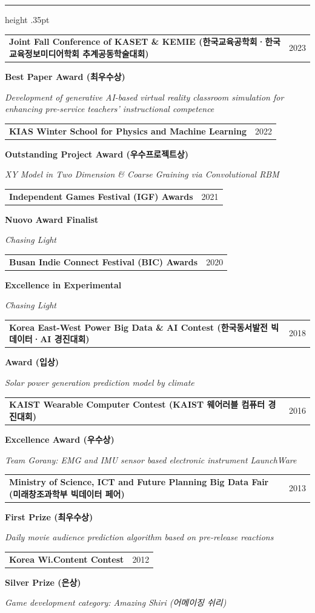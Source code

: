 \documentclass[overlapped,line]{res}
\makeatletter
\renewcommand{\sectionfont}{\normalsize\bfseries\scshape\color{cvnavy}}
\renewcommand{\section}[1]{%
  \par\Needspace{4\baselineskip}\addvspace{.105in}%
  \noindent{\sectionfont #1}\par\vspace{.025in}%
  {\color{cvrule}\hrule height .35pt}\vspace{.045in}%
  \nopagebreak[3]}
\newcommand{\cvdate}[1]{{\small\color{cvmuted}#1}}
\newcommand{\cvdetail}[1]{{\small\color{cvmuted}#1}}
\newcommand{\cvorg}[1]{{\small\bfseries\color{cvblue}#1}}
\newenvironment{cvitems}{
  \begin{list}{}{%
      \setlength{\itemsep}{.062in}
      \setlength{\parsep}{0in}
      \setlength{\parskip}{0in}
      \setlength{\topsep}{.025in}
      \setlength{\partopsep}{0in}
      \setlength{\leftmargin}{.12in}
      \setlength{\rightmargin}{0in}}}{\end{list}}
\newcommand{\awarditem}[4]{%
  \item\parbox[t]{\linewidth}{%
    \begin{tabularx}{\linewidth}{@{}Xr@{}}%
      \textbf{#3} & \cvdate{#2}%
    \end{tabularx}\par\vspace{.005in}%
    \cvorg{#1}\par\vspace{.005in}%
    \cvdetail{\textit{#4}}}}
\makeatother
\begin{document}
\begin{resume}
\section{\sc Awards}
\begin{cvitems}
\awarditem{Best Paper Award (최우수상)}{2023}{Joint Fall Conference of KASET \& KEMIE (한국교육공학회·한국교육정보미디어학회 추계공동학술대회)}{Development of generative AI-based virtual reality classroom simulation for enhancing pre-service teachers' instructional competence}
\awarditem{Outstanding Project Award (우수프로젝트상)}{2022}{KIAS Winter School for Physics and Machine Learning}{XY Model in Two Dimension \& Coarse Graining via Convolutional RBM}
\awarditem{Nuovo Award Finalist}{2021}{Independent Games Festival (IGF) Awards}{Chasing Light}
\awarditem{Excellence in Experimental}{2020}{Busan Indie Connect Festival (BIC) Awards}{Chasing Light}
\awarditem{Award (입상)}{2018}{Korea East-West Power Big Data \& AI Contest (한국동서발전 빅데이터·AI 경진대회)}{Solar power generation prediction model by climate}
\awarditem{Excellence Award (우수상)}{2016}{KAIST Wearable Computer Contest (KAIST 웨어러블 컴퓨터 경진대회)}{Team Gorany: EMG and IMU sensor based electronic instrument LaunchWare}
\awarditem{First Prize (최우수상)}{2013}{Ministry of Science, ICT and Future Planning Big Data Fair (미래창조과학부 빅데이터 페어)}{Daily movie audience prediction algorithm based on pre-release reactions}
\awarditem{Silver Prize (은상)}{2012}{Korea Wi.Content Contest}{Game development category: Amazing Shiri (어메이징 쉬리)}
\end{cvitems}

\end{resume}
\end{document}

